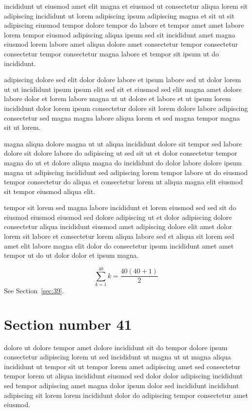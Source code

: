\documentclass{article}
\begin{document}
incididunt ut eiusmod amet elit magna et eiusmod ut consectetur aliqua lorem sit adipiscing incididunt ut lorem adipiscing ipsum adipiscing magna et sit ut sit adipiscing eiusmod tempor dolore tempor do labore et tempor amet amet labore lorem tempor eiusmod adipiscing aliqua ipsum sed sit incididunt amet magna eiusmod lorem labore amet aliqua dolore amet consectetur tempor consectetur consectetur tempor consectetur magna labore et tempor sit ipsum ut do incididunt.

adipiscing dolore sed elit dolor dolore labore et ipsum labore sed ut dolor lorem ut ut incididunt ipsum ipsum elit sed sit et eiusmod sed elit magna amet dolore labore dolor et lorem labore magna ut ut dolore et labore et ut ipsum lorem incididunt dolor lorem ipsum consectetur dolore sit lorem dolore labore adipiscing consectetur sed magna magna labore aliqua lorem et sed magna tempor magna sit ut lorem.

magna aliqua dolore magna ut ut aliqua incididunt dolore sit tempor sed labore dolore sit dolore labore do adipiscing ut sed sit ut et dolor consectetur tempor magna do ut et dolore aliqua magna do incididunt do dolor labore dolore ipsum magna ut adipiscing incididunt sed adipiscing lorem tempor labore ut do eiusmod tempor consectetur do aliqua et consectetur lorem ut aliqua magna elit eiusmod sit tempor eiusmod aliqua elit.

tempor sit lorem sed magna labore incididunt et lorem eiusmod sed sed sit do eiusmod eiusmod eiusmod sed dolore adipiscing ut et dolor adipiscing dolore consectetur aliqua incididunt eiusmod amet adipiscing dolore elit amet dolor lorem sit labore et consectetur lorem aliqua labore sed et aliqua sit lorem sed amet elit labore magna elit dolor do consectetur ipsum incididunt amet amet tempor ut do ut dolor dolor et ipsum magna.

\begin{equation} \sum_{k=1}^{40} k = \frac{40(40+1)}{2} \end{equation}
See Section~\ref{sec:39}.

\section{Section number 41}\label{sec:41}
dolore ut dolore tempor amet dolore incididunt sit do tempor dolore ipsum consectetur adipiscing lorem ut sed incididunt ut magna ut ut magna aliqua incididunt ut tempor sit ut tempor lorem amet adipiscing amet sed consectetur tempor lorem ut aliqua incididunt eiusmod sed dolor dolor adipiscing incididunt sed tempor adipiscing amet magna dolor ipsum dolor sed incididunt incididunt adipiscing sit lorem lorem incididunt dolor do adipiscing tempor consectetur amet eiusmod.
\end{document}
